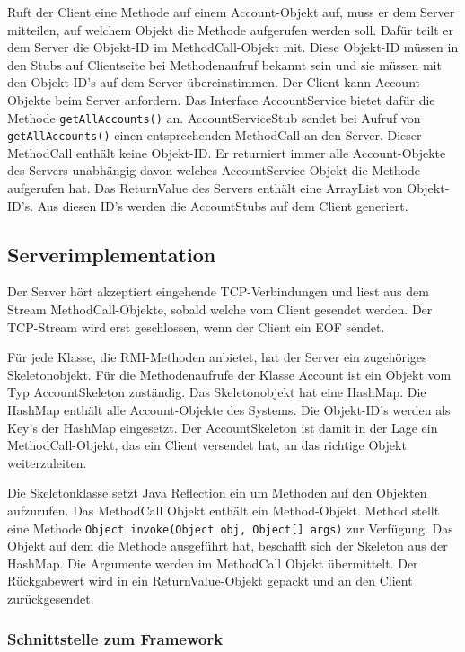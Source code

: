 Ruft der Client eine Methode auf einem Account-Objekt auf, muss er dem
Server mitteilen, auf welchem Objekt die Methode aufgerufen werden
soll. Dafür teilt er dem Server die Objekt-ID im MethodCall-Objekt
mit. Diese Objekt-ID müssen in den Stubs auf Clientseite bei
Methodenaufruf bekannt sein und sie müssen mit den Objekt-ID's auf dem
Server übereinstimmen. Der Client kann Account-Objekte beim Server
anfordern. Das Interface AccountService bietet dafür die Methode
\verb|getAllAccounts()| an. AccountServiceStub
sendet bei Aufruf von \verb|getAllAccounts()|
einen entsprechenden MethodCall an den Server. Dieser MethodCall
enthält keine Objekt-ID. Er returniert immer alle Account-Objekte des
Servers unabhängig davon welches AccountService-Objekt die Methode
aufgerufen hat. Das ReturnValue des Servers enthält eine ArrayList von
Objekt-ID's. Aus diesen ID's werden die AccountStubs auf dem Client generiert.

\subsection{Serverimplementation}
\label{sec:serverimplementation}

Der Server hört akzeptiert eingehende TCP-Verbindungen und liest aus
dem Stream MethodCall-Objekte, sobald welche vom Client gesendet
werden. Der TCP-Stream wird erst geschlossen, wenn der Client ein EOF
sendet.

Für jede Klasse, die RMI-Methoden anbietet, hat der Server ein
zuge\-hö\-ri\-ges Skeletonobjekt. Für die Methodenaufrufe
der Klasse Account ist ein Objekt vom Typ
AccountSkeleton zuständig. Das Skeletonobjekt hat eine HashMap. Die
HashMap enthält alle Account-Objekte des Systems. Die Objekt-ID's
werden als Key's der HashMap eingesetzt. Der AccountSkeleton ist damit
in der Lage ein MethodCall-Objekt, das ein Client versendet hat, an
das richtige Objekt weiterzuleiten. 

Die Skeletonklasse setzt Java Reflection ein um Methoden auf den
Objekten aufzurufen. Das MethodCall Objekt enthält ein
Method-Objekt. Method stellt eine Methode \verb|Object invoke(Object obj, Object[] args)|\- zur\- Ver\-füg\-ung. Das Objekt auf dem die Methode
ausgeführt hat, beschafft sich der Skeleton aus der HashMap. Die
Argumente werden im MethodCall Objekt übermittelt. Der Rückgabewert
wird in ein ReturnValue-Objekt gepackt und an den Client zurückgesendet.

\subsubsection{Schnittstelle zum Framework}
\label{sec:schn-zum-fram}

